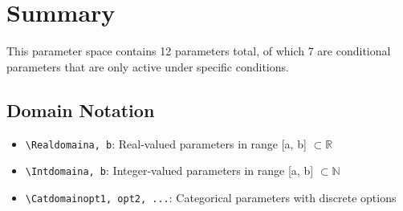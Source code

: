 \documentclass[11pt,a4paper]{article}
\begin{document}
\section{Summary}

This parameter space contains 12 parameters total, of which 7 are conditional parameters that are only active under specific conditions.

\subsection{Domain Notation}

\begin{itemize}
\item \texttt{\textbackslash Realdomain{a, b}}: Real-valued parameters in range [a, b] $\subset \mathbb{R}$
\item \texttt{\textbackslash Intdomain{a, b}}: Integer-valued parameters in range [a, b] $\subset \mathbb{N}$
\item \texttt{\textbackslash Catdomain{opt1, opt2, ...}}: Categorical parameters with discrete options
\end{itemize}
\end{document}

